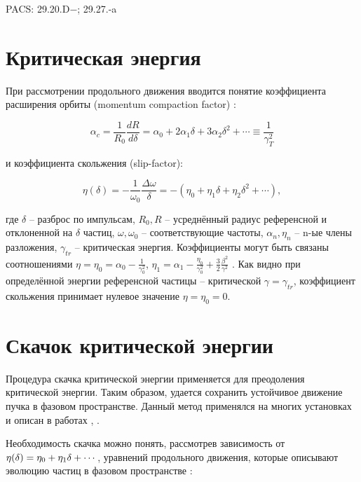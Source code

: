 \documentclass[a4paper]{panl}
\begin{document}
\noindent
PACS: 29.20.D−; 29.27.-a

\label{sec:transition}
\section*{Критическая энергия}

\par При рассмотрении продольного движения вводится понятие коэф\-фи\-ци\-ента
расширения орбиты (momentum compaction factor) \cite{lee}:

\begin{equation}
\alpha_c=\frac{1}{R_0} \frac{d R}{d \delta}=\alpha_0+2 \alpha_1 \delta+3 \alpha_2 \delta^2+\cdots \equiv \frac{1}{\gamma_T^2}
\label{alpha}
\end{equation}

и коэффициента скольжения (slip-factor):

\begin{equation}
\eta(\delta)=-\frac{1}{\omega_0} \frac{\Delta \omega}{\delta}=-\left(\eta_0+\eta_1 \delta+\eta_2 \delta^2+\cdots\right),
\label{eta}
\end{equation}

где $\delta$ – разброс по импульсам, $R_{0},R$ – усреднённый радиус референсной и отклоненной на $\delta$ частиц, $\omega, \omega_{0}$ – соответствующие частоты, $\alpha_n, \eta_n$ – n-ые члены разложения, $\gamma_{tr}$ – критическая энергия. Коэффициенты могут быть связаны соотношениями $\eta=\eta_{0}=\alpha_{0}-\frac{1}{\gamma_{0}^{2}}$, $\eta_{1}=\alpha_{1}-\frac{\eta_{0}}{\gamma_{0}^{2}}+\frac{3}{2} \frac{\beta^{2}}{\gamma^{2}}$ . Как видно при определённой энергии референсной частицы -- критической $\gamma = \gamma_{tr}$, коэффициент скольжения принимает нулевое значение $\eta = \eta_{0} = 0$.

\label{sec:jump}
\section*{Скачок критической энергии}

\par Процедура скачка критической энергии применяется для преодоления критической энергии. Таким образом, удается сохранить устойчивое движение пучка в фазовом пространстве. Данный метод применялся на многих установках и описан в работах \cite{jump}, \cite{pip}.

\par Необходимость скачка можно понять, рассмотрев зависимость от $\eta(\delta)\\=\eta_{0}+\eta_{1} \delta+\cdots$, уравнений продольного движения, которые описывают эволюцию частиц в фазовом пространстве \cite{hans}:
\end{document}
